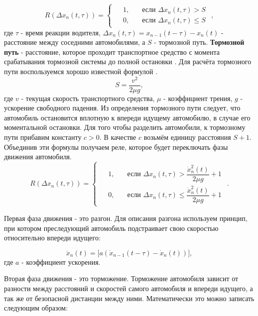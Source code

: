 \documentclass[12pt, a4paper]{extarticle}
\numberwithin{equation}{section}
\numberwithin{figure}{section}
\begin{document}
\begin{equation*}
R(\Delta x_{n}(t,\tau))=
\begin{cases}
\begin{split}
&1,\quad &\text{если }\Delta x_{n}(t,\tau) >S \\
&0,\quad &\text{если }\Delta x_{n}(t,\tau) \leq S
\end{split}
\end{cases},
\end{equation*}
где $\tau$ - время реакции водителя, $\Delta x_{n}(t,\tau)=x_{n-1}(t-\tau)-x_n(t)$ - расстояние между соседними автомобилями, а $S$ - тормозной путь. \textbf{Тормозной путь} - расстояние, которое проходит транспортное средство с момента срабатывания тормозной системы до полной остановки \cite{PDD}. Для расчёта тормозного пути воспользуемся хорошо известной формулой \cite{Physics}.
\begin{equation*} 
S=\dfrac{v^2}{2\mu g},
\end{equation*}
где $v$ - текущая скорость транспортного средства, $\mu$ - коэффициент трения, $g$ - ускорение свободного падения. Из определения тормозного пути следует, что автомобиль остановится вплотную к впереди идущему автомобилю, в случае его моментальной остановки. Для того чтобы разделить автомобили, к тормозному пути прибавим константу $c > 0$. В качестве $c$ возьмём единицу расстояния $S+1$. Объединив эти формулы получаем реле, которое будет переключать фазы движения автомобиля.
\begin{equation}\label{rele}
R(\Delta x_{n}(t,\tau))=
\begin{cases}
\begin{split}
&1,\quad &\text{если }\Delta x_{n}(t,\tau) > \dfrac{\dot{x}_n^2(t)}{2\mu g}+1 \\
&0,\quad &\text{если }\Delta x_{n}(t,\tau) \leq \dfrac{\dot{x}_n^2(t)}{2\mu g}+1
\end{split}
\end{cases}.
\end{equation}

Первая фаза движения - это разгон. Для описания разгона используем принцип, при котором преследующий автомобиль подстраивает свою скоростью относительно впереди идущего:

\begin{equation*}
\ddot{x}_n(t)= \bigg[ a(\dot{x}_{n-1}(t-\tau)-\dot{x}_n(t))\bigg],
\end{equation*}
где $a$ - коэффициент ускорения.

Вторая фаза движения - это торможение. Торможение автомобиля зависит от разности между расстояний и скоростей самого автомобиля и впереди идущего, а так же от безопасной дистанции между ними. Математически это можно записать следующим образом: 
\end{document}
